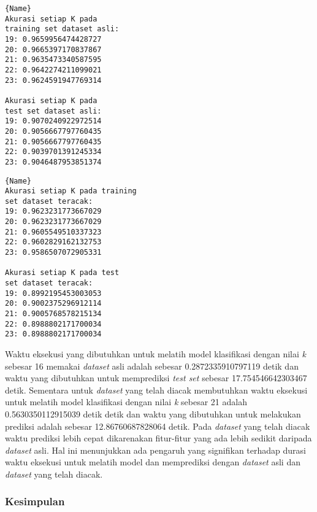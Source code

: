 \noindent\begin{minipage}{.46\textwidth}
	\begin{lstlisting}[caption=\textit{Dataset mobile\_sensor} Asli,frame=tlrb, label=mobile_sensor_akurasi_asli]{Name}
Akurasi setiap K pada 
training set dataset asli: 
19: 0.9659956474428727
20: 0.9665397170837867
21: 0.9635473340587595
22: 0.9642274211099021
23: 0.9624591947769314

Akurasi setiap K pada 
test set dataset asli: 
19: 0.9070240922972514
20: 0.9056667797760435
21: 0.9056667797760435
22: 0.9039701391245334
23: 0.9046487953851374
	\end{lstlisting}
	\end{minipage}\hfill
	\begin{minipage}{.46\textwidth}
	\begin{lstlisting}[caption=\textit{Dataset mobile\_sensor} Teracak,frame=tlrb, label=mobile_sensor_akurasi_randomisasi]{Name}
Akurasi setiap K pada training 
set dataset teracak: 
19: 0.9623231773667029
20: 0.9623231773667029
21: 0.9605549510337323
22: 0.9602829162132753
23: 0.9586507072905331

Akurasi setiap K pada test 
set dataset teracak: 
19: 0.8992195453003053
20: 0.9002375296912114
21: 0.9005768578215134
22: 0.8988802171700034
23: 0.8988802171700034
	\end{lstlisting}
\end{minipage}

Waktu eksekusi yang dibutuhkan untuk melatih model klasifikasi dengan nilai \textit{k} sebesar 16 memakai \textit{dataset} asli adalah sebesar 0.2872335910797119 detik dan waktu yang dibutuhkan untuk memprediksi \textit{test set} sebesar 17.754546642303467 detik. Sementara untuk \textit{dataset} yang telah diacak membutuhkan waktu eksekusi untuk melatih model klasifikasi dengan nilai \textit{k} sebesar 21 adalah 0.5630350112915039 detik detik dan waktu yang dibutuhkan untuk melakukan prediksi adalah sebesar 12.86760687828064 detik. Pada \textit{dataset} yang telah diacak waktu prediksi lebih cepat dikarenakan fitur-fitur yang ada lebih sedikit daripada \textit{dataset} asli. Hal ini menunjukkan ada pengaruh yang signifikan terhadap durasi waktu eksekusi untuk melatih model dan memprediksi dengan \textit{dataset} asli dan \textit{dataset} yang telah diacak.

\subsubsection{Kesimpulan}
\label{subsubsec:pengujian-klasifikasi-kesimpulan}

